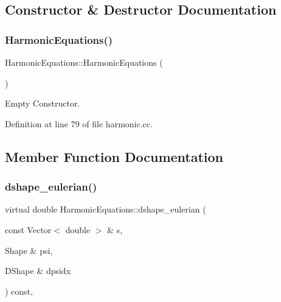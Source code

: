 \subsection{Constructor \& Destructor Documentation}
\mbox{\label{classHarmonicEquations_a288d1c0777b2cf5360e1310d48f8c217}} 
\subsubsection{\texorpdfstring{Harmonic\+Equations()}{HarmonicEquations()}}
{\footnotesize\ttfamily Harmonic\+Equations\+::\+Harmonic\+Equations (\begin{DoxyParamCaption}{ }\end{DoxyParamCaption})\hspace{0.3cm}{\ttfamily [inline]}}



Empty Constructor. 



Definition at line 79 of file harmonic.\+cc.



\subsection{Member Function Documentation}
\mbox{\label{classHarmonicEquations_ae013637e60841f46cf4c452ee3469163}} 
\subsubsection{\texorpdfstring{dshape\+\_\+eulerian()}{dshape\_eulerian()}}
{\footnotesize\ttfamily virtual double Harmonic\+Equations\+::dshape\+\_\+eulerian (\begin{DoxyParamCaption}\item[{const Vector$<$ double $>$ \&}]{s,  }\item[{Shape \&}]{psi,  }\item[{D\+Shape \&}]{dpsidx }\end{DoxyParamCaption}) const\hspace{0.3cm}{\ttfamily [protected]}, {}}




